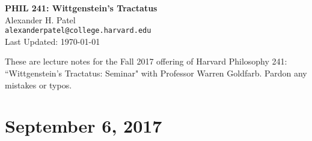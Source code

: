 \documentclass[12pt]{article}
\theoremstyle{definition}
\begin{document}
\begin{center}
\textbf{PHIL 241: Wittgenstein's Tractatus} \\
Alexander H. Patel \\
{\tt alexanderpatel@college.harvard.edu} \\
Last Updated: \today
\end{center}

These are lecture notes for the Fall 2017 offering of Harvard Philosophy 241:
``Wittgenstein's Tractatus: Seminar" with Professor Warren Goldfarb. Pardon any
mistakes or typos.

\tableofcontents

\section{September 6, 2017}
\end{document}
